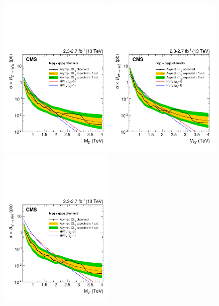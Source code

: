 \begin{figure}[!htb]
\centering
     \includegraphics[width=0.49\textwidth]{figures/analysis/search1/B2G-16-004//EXOVVhvt_JJLVJZPRIME13_UL_Asymptotic_log.pdf}%
     \includegraphics[width=0.49\textwidth]{figures/analysis/search1/B2G-16-004//EXOVVhvt_JJLVJWPRIME13_UL_Asymptotic_log.pdf}\\     
     \includegraphics[width=0.49\textwidth]{figures/analysis/search1/B2G-16-004//EXOVVhvt_JJLVJHVT13_UL_Asymptotic_log.pdf}%

\end{figure}
